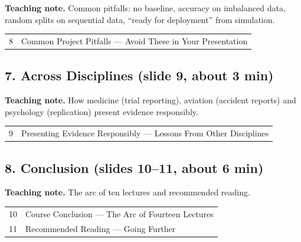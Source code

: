 \documentclass[11pt]{article}
\begin{document}
\textbf{Teaching note.} Common pitfalls: no baseline, accuracy on imbalanced data, random splits on sequential data, ``ready for deployment'' from simulation.

\begin{center}\small\renewcommand{\arraystretch}{1.1}\begin{tabularx}{\textwidth}{@{}r X@{}}8 & Common Project Pitfalls --- Avoid These in Your Presentation\\\end{tabularx}\end{center}

\subsection{7. Across Disciplines \normalfont\small\color{GreyN}(slide 9, about 3 min)}

\textbf{Teaching note.} How medicine (trial reporting), aviation (accident reports) and psychology (replication) present evidence responsibly.

\begin{center}\small\renewcommand{\arraystretch}{1.1}\begin{tabularx}{\textwidth}{@{}r X@{}}9 & Presenting Evidence Responsibly --- Lessons From Other Disciplines\\\end{tabularx}\end{center}

\subsection{8. Conclusion \normalfont\small\color{GreyN}(slides 10--11, about 6 min)}

\textbf{Teaching note.} The arc of ten lectures and recommended reading.

\begin{center}\small\renewcommand{\arraystretch}{1.1}\begin{tabularx}{\textwidth}{@{}r X@{}}10 & Course Conclusion --- The Arc of Fourteen Lectures\\
11 & Recommended Reading --- Going Further\\\end{tabularx}\end{center}
\end{document}
